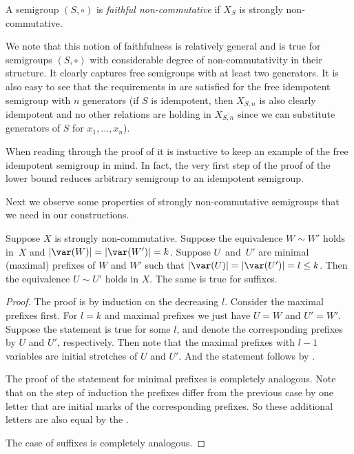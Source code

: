 \documentclass{toc}
\begin{document}
\begin{definition}
	\label{def:faithful}
	A semigroup $(S, \circ)$ is \emph{faithful non-commutative} if $X_S$ is strongly
	non-commutative.
\end{definition}

We note that this notion of faithfulness is relatively general and is true for
semigroups $(S,\circ)$ with considerable degree of non-commutativity in their
structure. It clearly captures free semigroups with at least two generators. It
is also easy to see that the
requirements in  are satisfied for the free
idempotent semigroup with $n$ generators (if $S$ is idempotent, then $X_{S,n}$
is also clearly idempotent and no other relations are holding in $X_{S,n}$ since
we can substitute generators of $S$ for $x_1, \ldots, x_n$).

When reading through the proof of  it is instuctive to keep an example of the free idempotent semigroup in mind. In fact, the very first step of the proof of the lower bound reduces arbitrary semigroup to an idempotent semigroup.

Next we observe some properties of strongly non-commutative semigroups that we
need in our constructions.

%

\begin{lemma} \label{lem:prefix_equivalence}
Suppose $X$ is strongly non-commutative. Suppose the equivalence $W \sim W'$
holds in~$X$ and $|\var(W)|=|\var(W')|=k$. Suppose $U$~and~$U'$ are minimal
(maximal) prefixes of $W$ and $W'$ such that $|\var(U)| = |\var(U')| = l\leq k$.
Then the equivalence $U \sim U'$ holds in $X$. The same is true for suffixes.
\end{lemma}

\begin{proof}
The proof is by induction on the decreasing $l$. Consider the maximal prefixes
first. For $l=k$ and maximal prefixes we just have $U=W$ and $U'=W'$. Suppose
the statement is true for some $l$, and denote the corresponding prefixes by $U$
and $U'$, respectively. Then note that the maximal prefixes with $l-1$ variables
are
%
%
initial stretches %
of $U$ and $U'$. And the statement follows by
.

The proof of the statement for minimal prefixes is completely analogous. Note
that on the step of induction the prefixes differ from the previous case by one
letter that are initial marks of the corresponding prefixes. So these additional
letters are also equal by the .

The case of suffixes is completely analogous.
\end{proof}
\end{document}
